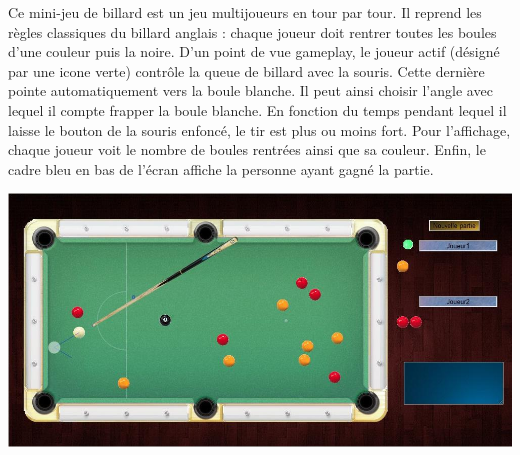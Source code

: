 \begin{minipage}{9cm}
Ce mini-jeu de billard est un jeu multijoueurs en tour par tour. 
Il reprend les règles classiques du billard anglais : chaque joueur doit rentrer toutes les boules d’une couleur puis la noire. 
D’un point de vue gameplay, le joueur actif (désigné par une icone verte) contrôle la queue de billard avec la souris. Cette dernière pointe automatiquement vers la boule blanche. 
Il peut ainsi choisir l’angle avec lequel il compte frapper la boule blanche. En fonction du temps pendant lequel
 il laisse le bouton de la souris enfoncé, le tir est plus ou moins fort. 
Pour l’affichage, chaque joueur voit le nombre de boules rentrées ainsi que sa couleur. 
Enfin, le cadre bleu en bas de l’écran affiche la personne ayant gagné la partie.
\end{minipage}
\hfill
\begin{minipage}{6cm}
 \includegraphics[width=\linewidth]{img/capturejeu_billard}
\end{minipage}


